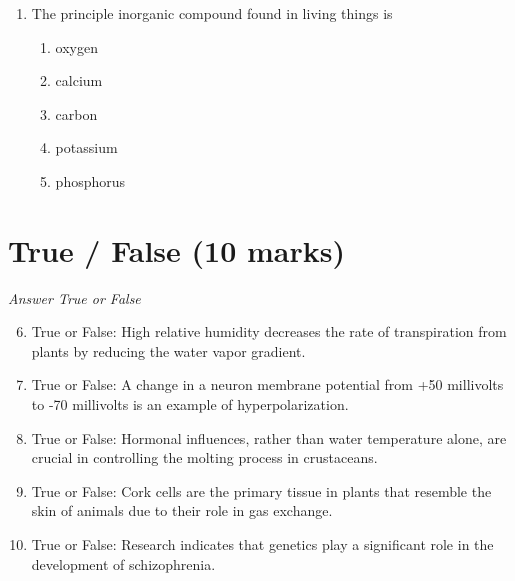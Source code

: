 \documentclass[12pt]{article}
\begin{document}
\begin{enumerate}[label=\arabic*.]
\begin{enumerate}[label=(\alph*)]
    \item Ferns grow larger because they can perform photosynthesis more efficiently than mosses
    \item Ferns grow larger due to higher nutrient content
    \item Ferns grow larger due to a stronger stem
    \item Ferns grow larger due to their ability to move to more fertile areas
    \item Mosses are limited in size by their shorter life cycle compared to ferns
\end{enumerate}
\item The principle inorganic compound found in living things is
\begin{enumerate}[label=(\alph*)]
    \item oxygen
    \item calcium
    \item carbon
    \item potassium
    \item phosphorus
\end{enumerate}
\end{enumerate}

\section*{True / False (10 marks)}
\textit{Answer True or False}
\begin{enumerate}[label=\arabic*.]
\setcounter{enumi}{5}
\item True or False: High relative humidity decreases the rate of transpiration from plants by reducing the water vapor gradient.
\item True or False: A change in a neuron membrane potential from +50 millivolts to -70 millivolts is an example of hyperpolarization.
\item True or False: Hormonal influences, rather than water temperature alone, are crucial in controlling the molting process in crustaceans.
\item True or False: Cork cells are the primary tissue in plants that resemble the skin of animals due to their role in gas exchange.
\item True or False: Research indicates that genetics play a significant role in the development of schizophrenia.
\end{enumerate}
\end{document}
